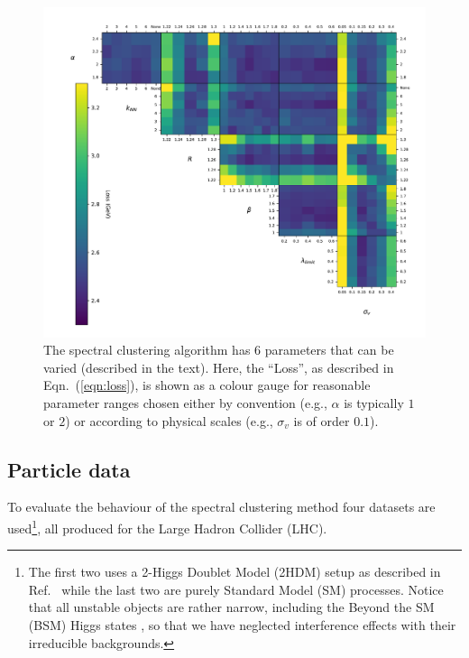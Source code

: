     \begin{figure}[!t]
            \includegraphics[width=1\textwidth]{graphics/trangle_scan_complete}
            \caption{The spectral clustering algorithm has 6 parameters that can be varied (described in the text).
                Here, the ``Loss'', as described in Eqn.~(\ref{eqn:loss}), is shown as a colour gauge for reasonable  parameter ranges chosen
                either by convention (e.g., \(\alpha\) is typically \(1\) or \(2\))
                or according to physical scales (e.g., \(\sigma_v\) is of order \(0.1\)).
             }\label{fig:scan_spectral}
    \end{figure}    


    \subsection{Particle data}\label{sec:particle_data}

To evaluate the behaviour of the spectral clustering method four datasets are used\footnote{The first two uses a 2-Higgs Doublet Model (2HDM) setup as described in Ref.~\cite{Chakraborty:2020vwj} while the last two are purely Standard Model (SM) processes. Notice that all unstable objects are rather narrow, including the Beyond the SM (BSM) Higgs states \cite{Moretti:1994ds,Djouadi:1995gv}, so that we have neglected interference effects with their irreducible backgrounds.}, all produced for the Large Hadron Collider (LHC).


